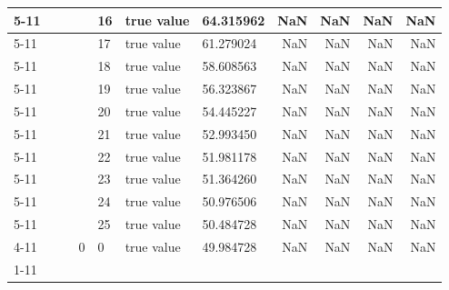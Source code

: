\begin{tabular}{lllllllrrrr}
\cline{5-11}
 &  &  &  & 16 & true value & 64.315962 & NaN & NaN & NaN & NaN \\
\cline{5-11}
 &  &  &  & 17 & true value & 61.279024 & NaN & NaN & NaN & NaN \\
\cline{5-11}
 &  &  &  & 18 & true value & 58.608563 & NaN & NaN & NaN & NaN \\
\cline{5-11}
 &  &  &  & 19 & true value & 56.323867 & NaN & NaN & NaN & NaN \\
\cline{5-11}
 &  &  &  & 20 & true value & 54.445227 & NaN & NaN & NaN & NaN \\
\cline{5-11}
 &  &  &  & 21 & true value & 52.993450 & NaN & NaN & NaN & NaN \\
\cline{5-11}
 &  &  &  & 22 & true value & 51.981178 & NaN & NaN & NaN & NaN \\
\cline{5-11}
 &  &  &  & 23 & true value & 51.364260 & NaN & NaN & NaN & NaN \\
\cline{5-11}
 &  &  &  & 24 & true value & 50.976506 & NaN & NaN & NaN & NaN \\
\cline{5-11}
 &  &  &  & 25 & true value & 50.484728 & NaN & NaN & NaN & NaN \\
\cline{4-11} \cline{5-11}
 &  &  & 0 & 0 & true value & 49.984728 & NaN & NaN & NaN & NaN \\
\cline{1-11} \cline{2-11} \cline{3-11} \cline{4-11} \cline{5-11}
\bottomrule
\end{tabular}
